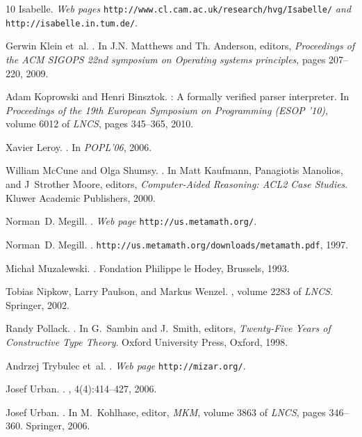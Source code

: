 \documentclass{entcs}
\begin{document}
\begin{thebibliography}{10}
{Isabelle}.
\newblock \emph{Web pages}
  \texttt{http://www.cl.cam.ac.uk/research/hvg/Isabelle/} \emph{and}
  \texttt{http://{}isabelle.{}in.tum.de/}.

Gerwin Klein et~al.
.
\newblock In J.N. Matthews and Th. Anderson, editors, {\em {Proceedings of the
  ACM SIGOPS 22nd symposium on Operating systems principles}}, pages 207--220,
  2009.

Adam Koprowski and Henri Binsztok.
: A formally verified parser interpreter.
\newblock In {\em Proceedings of the 19th European Symposium on Programming
  (ESOP '10)}, volume 6012 of {\em LNCS}, pages 345--365, 2010.

Xavier Leroy.
.
\newblock In {\em {POPL'06}}, 2006.

William McCune and Olga Shumsy.
.
\newblock In Matt Kaufmann, Panagiotis Manolios, and J~Strother Moore, editors,
  {\em {Computer-Aided Reasoning: ACL2 Case Studies}}. Kluwer Academic
  Publishers, 2000.

Norman~D. Megill.
.
\newblock \emph{Web page} \texttt{http://us.metamath.org/}.

Norman~D. Megill.
.
\newblock \texttt{http://us.{}metamath.org/downloads/metamath.pdf},
  1997.

Micha{\l} Muzalewski.
.
\newblock Fondation Philippe le Hodey, Brussels, 1993.

Tobias Nipkow, Larry Paulson, and Markus Wenzel.
,
  volume 2283 of {\em LNCS}.
\newblock Springer, 2002.

Randy Pollack.
.
\newblock In G.~Sambin and J.~Smith, editors, {\em Twenty-Five Years of
  Constructive Type Theory}. Oxford University Press, Oxford, 1998.

Andrzej Trybulec et~al.
.
\newblock \emph{Web page} \texttt{http://mizar.org/}.

Josef Urban.
.
, 4(4):414--427, 2006.

Josef Urban.
.
\newblock In M.~Kohlhase, editor, {\em MKM}, volume 3863 of {\em LNCS}, pages
  346--360. Springer, 2006.

\end{thebibliography}
\end{document}
